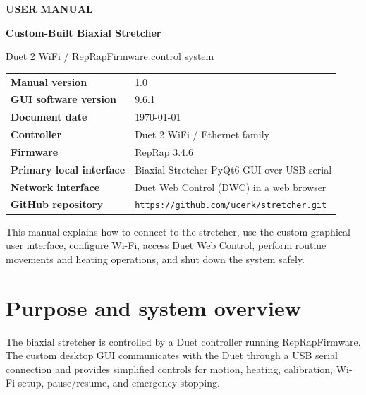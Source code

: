\documentclass[11pt,a4paper]{article}
\newcommand{\manualversion}{1.0}
\newcommand{\softwareversion}{9.6.1}
\newcommand{\firmwareversion}{3.4.6}
\newcommand{\manualdate}{\today}
\begin{document}
\begin{titlepage}
\centering
\vspace*{2.0cm}
{\Huge\bfseries\color{ManualBlue} USER MANUAL\par}
\vspace{0.8cm}
{\LARGE\bfseries Custom-Built Biaxial Stretcher\par}
\vspace{0.5cm}
{\large Duet 2 WiFi / RepRapFirmware control system\par}
\vspace{1.5cm}

\begin{tabularx}{0.88\textwidth}{>{\bfseries}p{} X}
\toprule
Manual version & \manualversion \\
GUI software version & \softwareversion \\
Document date & \manualdate \\
Controller & Duet 2 WiFi / Ethernet family \\
Firmware & RepRap \firmwareversion \\
Primary local interface & Biaxial Stretcher PyQt6 GUI over USB serial \\
Network interface & Duet Web Control (DWC) in a web browser \\
GitHub repository &
\href{https://github.com/ucerk/stretcher.git}
{\texttt{https://github.com/ucerk/stretcher.git}} \\
\bottomrule
\end{tabularx}

\vfill
\begin{minipage}{0.88\textwidth}
This manual explains how to connect to the stretcher, use the custom graphical user interface, configure Wi-Fi, access Duet Web Control, perform routine movements and heating operations, and shut down the system safely.
\end{minipage}
\vfill
\end{titlepage}

\tableofcontents
\newpage

\section{Purpose and system overview}

The biaxial stretcher is controlled by a Duet controller running RepRapFirmware. The custom desktop GUI communicates with the Duet through a USB serial connection and provides simplified controls for motion, heating, calibration, Wi-Fi setup, pause/resume, and emergency stopping.
\end{document}
